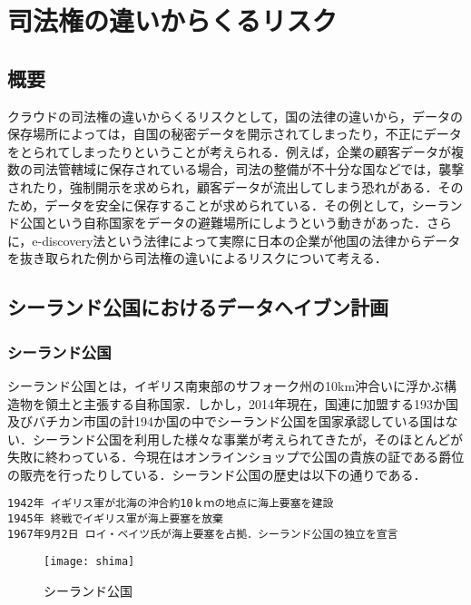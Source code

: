 \section{司法権の違いからくるリスク}
\subsection{概要}
クラウドの司法権の違いからくるリスクとして，国の法律の違いから，データの保存場所によっては，自国の秘密データを開示されてしまったり，不正にデータをとられてしまったりということが考えられる．例えば，企業の顧客データが複数の司法管轄域に保存されている場合，司法の整備が不十分な国などでは，襲撃されたり，強制開示を求められ，顧客データが流出してしまう恐れがある．そのため，データを安全に保存することが求められている．その例として，シーランド公国という自称国家をデータの避難場所にしようという動きがあった．さらに，e-discovery法という法律によって実際に日本の企業が他国の法律からデータを抜き取られた例から司法権の違いによるリスクについて考える．

\subsection{シーランド公国におけるデータヘイブン計画}
\subsubsection{シーランド公国}
シーランド公国\cite{sealand}とは，イギリス南東部のサフォーク州の10km沖合いに浮かぶ構造物を領土と主張する自称国家．しかし，2014年現在，国連に加盟する193か国及びバチカン市国の計194か国の中でシーランド公国を国家承認している国はない．シーランド公国を利用した様々な事業が考えられてきたが，そのほとんどが失敗に終わっている．今現在はオンラインショップで公国の貴族の証である爵位の販売を行ったりしている．シーランド公国の歴史は以下の通りである．
\begin{verbatim}
1942年 イギリス軍が北海の沖合約10ｋｍの地点に海上要塞を建設 
1945年 終戦でイギリス軍が海上要塞を放棄
1967年9月2日 ロイ・ベイツ氏が海上要塞を占拠．シーランド公国の独立を宣言
\end{verbatim}

\begin{figure}[h!]
\begin{center}
\texttt{[image: shima]}
\caption{シーランド公国}
\end{center}
\end{figure}

